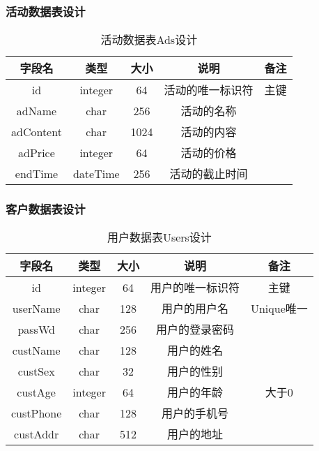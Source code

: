 \subsubsection{活动数据表设计}
\begin{table}[H]
\centering
\caption{活动数据表Ads设计} \label{tab:order-database}
\begin{tabular}{|c|c|c|c|c|}
    \hline
    字段名 & 类型 & 大小 & 说明 & 备注 \\
    \hline
    id & integer & 64 & 活动的唯一标识符 & 主键\\
    \hline
    adName & char & 256 & 活动的名称 &  \\
    \hline
    adContent & char & 1024 & 活动的内容 & \\
    \hline
    adPrice & integer & 64 & 活动的价格 & \\
    \hline
    endTime & dateTime & 256 & 活动的截止时间 & \\
    \hline
\end{tabular}
\end{table}

\subsubsection{客户数据表设计}
\begin{table}[H]
\centering
\caption{用户数据表Users设计} \label{tab:client-database}
\begin{tabular}{|c|c|c|c|c|}
    \hline
    字段名 & 类型 & 大小 & 说明 & 备注 \\
    \hline
    id & integer & 64 & 用户的唯一标识符 & 主键\\
    \hline
    userName & char & 128 & 用户的用户名 & Unique唯一 \\
    \hline
    passWd & char & 256 & 用户的登录密码 & \\
    \hline
    custName & char & 128 & 用户的姓名 & \\
    \hline
    custSex & char & 32 & 用户的性别 & \\
    \hline
    custAge & integer & 64 & 用户的年龄 & 大于0 \\
    \hline
    custPhone & char & 128 & 用户的手机号 & \\
    \hline
    custAddr & char & 512 & 用户的地址 & \\
    \hline
\end{tabular}
\end{table}



